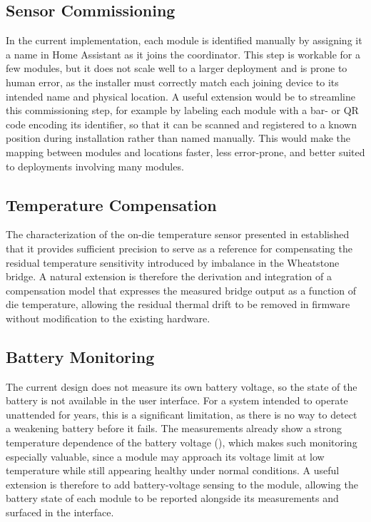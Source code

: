 \subsection{Sensor Commissioning}
In the current implementation, each module is identified manually by assigning it a name in Home Assistant as it joins the coordinator. This step is workable for a few modules, but it does not scale well to a larger deployment and is prone to human error, as the installer must correctly match each joining device to its intended name and physical location. A useful extension would be to streamline this commissioning step, for example by labeling each module with a bar- or QR code encoding its identifier, so that it can be scanned and registered to a known position during installation rather than named manually. This would make the mapping between modules and locations faster, less error-prone, and better suited to deployments involving many modules.

\subsection{Temperature Compensation}
The characterization of the on-die temperature sensor presented in  established that it provides sufficient precision to serve as a reference for compensating the residual temperature sensitivity introduced by imbalance in the Wheatstone bridge. A natural extension is therefore the derivation and integration of a compensation model that expresses the measured bridge output as a function of die temperature, allowing the residual thermal drift to be removed in firmware without modification to the existing hardware.

\subsection{Battery Monitoring}
The current design does not measure its own battery voltage, so the state of the battery is not available in the user interface. For a system intended to operate unattended for years, this is a significant limitation, as there is no way to detect a weakening battery before it fails. The measurements already show a strong temperature dependence of the battery voltage (), which makes such monitoring especially valuable, since a module may approach its voltage limit at low temperature while still appearing healthy under normal conditions. A useful extension is therefore to add battery-voltage sensing to the module, allowing the battery state of each module to be reported alongside its measurements and surfaced in the interface.

